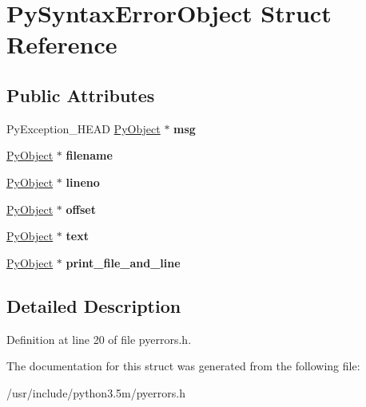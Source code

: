 \hypertarget{structPySyntaxErrorObject}{}\section{Py\+Syntax\+Error\+Object Struct Reference}
\label{structPySyntaxErrorObject}
\subsection*{Public Attributes}
\begin{DoxyCompactItemize}
\item 
Py\+Exception\+\_\+\+H\+E\+AD \hyperlink{struct__object}{Py\+Object} $\ast$ {\bfseries msg}\hypertarget{structPySyntaxErrorObject_a71896ef95d204cabfffbc25c44338a43}{}\label{structPySyntaxErrorObject_a71896ef95d204cabfffbc25c44338a43}

\item 
\hyperlink{struct__object}{Py\+Object} $\ast$ {\bfseries filename}\hypertarget{structPySyntaxErrorObject_aed7ca919fca31f79cda28d1cb0d62755}{}\label{structPySyntaxErrorObject_aed7ca919fca31f79cda28d1cb0d62755}

\item 
\hyperlink{struct__object}{Py\+Object} $\ast$ {\bfseries lineno}\hypertarget{structPySyntaxErrorObject_a518424d9f51fde459c23101d19e49c85}{}\label{structPySyntaxErrorObject_a518424d9f51fde459c23101d19e49c85}

\item 
\hyperlink{struct__object}{Py\+Object} $\ast$ {\bfseries offset}\hypertarget{structPySyntaxErrorObject_a0cb77b0acc909058c6c74cfdaa1ffdda}{}\label{structPySyntaxErrorObject_a0cb77b0acc909058c6c74cfdaa1ffdda}

\item 
\hyperlink{struct__object}{Py\+Object} $\ast$ {\bfseries text}\hypertarget{structPySyntaxErrorObject_aebd47dd29210b4107549874ee2253ede}{}\label{structPySyntaxErrorObject_aebd47dd29210b4107549874ee2253ede}

\item 
\hyperlink{struct__object}{Py\+Object} $\ast$ {\bfseries print\+\_\+file\+\_\+and\+\_\+line}\hypertarget{structPySyntaxErrorObject_a2680fe45d034e0d79c6395787b0186dd}{}\label{structPySyntaxErrorObject_a2680fe45d034e0d79c6395787b0186dd}

\end{DoxyCompactItemize}


\subsection{Detailed Description}


Definition at line 20 of file pyerrors.\+h.



The documentation for this struct was generated from the following file\+:\begin{DoxyCompactItemize}
\item 
/usr/include/python3.\+5m/pyerrors.\+h\end{DoxyCompactItemize}
